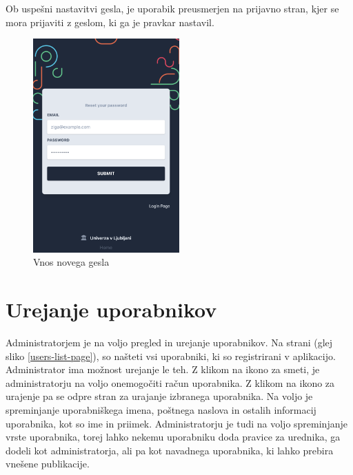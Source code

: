 \documentclass[a4paper, 12pt]{book}
\begin{document}
Ob uspešni nastavitvi gesla, je uporabik preusmerjen na prijavno stran, kjer se mora prijaviti z geslom, ki ga je pravkar nastavil.

\begin{figure}[h]
\begin{center}
\includegraphics[width=0.5\textwidth]{slike/reset_password.png}
\end{center}
\caption{ Vnos novega gesla }
\label{password-reset-form}
\end{figure}

\section{Urejanje uporabnikov}
\label{administracija-uporabnikov}
Administratorjem je na voljo pregled in urejanje uporabnikov. Na strani  (glej sliko \ref{users-list-page}), so našteti vsi uporabniki, ki so registrirani v aplikacijo. Administrator ima možnost urejanje le teh. Z klikom na ikono za smeti, je administratorju na voljo onemogočiti račun uporabnika. Z klikom na ikono za urajenje pa se odpre stran za urajanje izbranega uporabnika. Na voljo je spreminjanje uporabniškega imena, poštnega naslova in ostalih informacij uporabnika, kot so ime in priimek. Administratorju je tudi na voljo spreminjanje vrste uporabnika, torej lahko nekemu uporabniku doda pravice za urednika, ga dodeli kot administratorja, ali pa kot navadnega uporabnika, ki lahko prebira vnešene publikacije.
\end{document}
